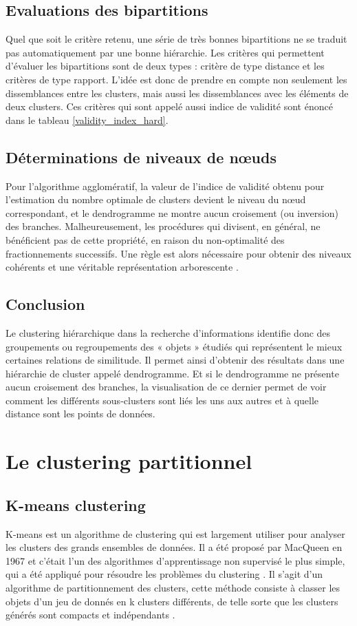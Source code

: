 \subsection{Evaluations des bipartitions}
Quel que soit le critère retenu, une série de très bonnes bipartitions ne se traduit pas automatiquement par une bonne hiérarchie. Les critères qui permettent d’évaluer les bipartitions sont de deux types : critère de type distance et les critères de type rapport. L’idée est donc de prendre en compte non seulement les dissemblances entre les clusters, mais aussi les dissemblances avec les éléments de deux clusters. Ces critères qui sont appelé aussi indice de validité sont énoncé dans le tableau \ref{validity_index_hard}.

\subsection{Déterminations de niveaux de nœuds }
Pour l’algorithme agglomératif, la valeur de l’indice de validité obtenu pour l’estimation du nombre optimale de clusters devient le niveau du nœud correspondant, et le dendrogramme ne montre aucun croisement (ou inversion) des branches. Malheureusement, les procédures qui divisent, en général, ne bénéficient pas de cette propriété, en raison du non-optimalité des fractionnements successifs. Une règle est alors nécessaire pour obtenir des niveaux cohérents et une véritable représentation arborescente \cite{roux2018comparative}.
\subsection{Conclusion}
Le clustering hiérarchique dans la recherche d'informations identifie donc des groupements ou regroupements des « objets » étudiés qui représentent le mieux certaines relations de similitude. Il permet ainsi d’obtenir des résultats dans une hiérarchie de cluster appelé dendrogramme. Et si le dendrogramme ne présente aucun croisement des branches, la visualisation de ce dernier permet de voir comment les différents sous-clusters sont liés les uns aux autres et à quelle distance sont les points de données.
\section{Le clustering partitionnel}

\subsection{K-means clustering}
K-means est un algorithme de clustering qui est largement utiliser pour analyser les clusters des grands ensembles de données. Il a été proposé par MacQueen en 1967 et c’était l’un des algorithmes d’apprentissage non supervisé le plus simple, qui a été appliqué pour résoudre les problèmes du clustering \cite{sun2008clustering}. Il s'agit d'un algorithme de partitionnement des clusters, cette méthode consiste à classer les objets d’un jeu de donnés en k clusters différents, de telle sorte que les clusters générés sont compacts et indépendants \cite{na2010research}.

